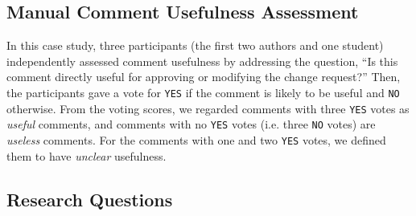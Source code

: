 \subsection{Manual Comment Usefulness Assessment}
In this case study, three participants (the first two authors and one student) independently assessed comment usefulness by addressing the question, ``Is this comment directly useful for approving or modifying the change request?''
Then, the participants gave a vote for \texttt{YES} if the comment is likely to be useful and \texttt{NO} otherwise.
From the voting scores, we regarded comments with three \texttt{YES} votes as \emph{useful} comments, and comments with no \texttt{YES} votes (i.e. three \texttt{NO} votes) are \emph{useless} comments. For the comments with one and two \texttt{YES} votes, we defined them to have \emph{unclear} usefulness. 

\subsection{Research Questions}

